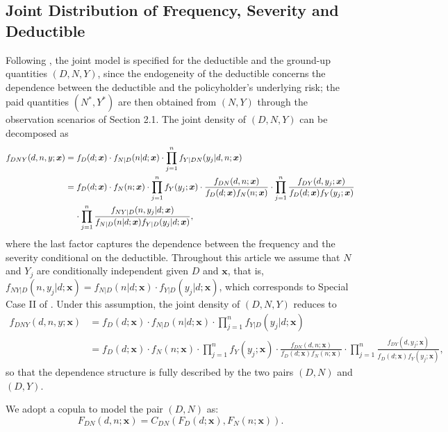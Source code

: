 \documentclass[11pt]{article}
\begin{document}
\subsection{Joint Distribution of Frequency, Severity and Deductible}
\label{sec:distn}

{Following \citet{shi2022copula}, the joint model is specified for the deductible and the ground-up quantities $(D,N,Y)$, since the endogeneity of the deductible concerns the dependence between the deductible and the policyholder's underlying risk; the paid quantities $(N^*, Y^*)$ are then obtained from $(N,Y)$ through the observation scenarios of Section 2.1. The joint density of $(D,N,Y)$ can be decomposed as}
{
\begin{align*}
   f_{DNY}(d,n,y;\bm{x}) &= f_{D}(d;\bm{x})\cdot f_{N|D}(n|d;\bm{x})\cdot \prod_{j=1}^{n}f_{Y|DN}(y_j|d,n;\bm{x})\\
   & =f_D(d;\bm{x})\cdot f_{N}(n;\bm{x})\cdot \prod_{j=1}^{n}f_{Y}(y_j;\bm{x})\cdot\frac{f_{DN}(d,n;\bm{x})}{f_D(d;\bm{x})f_{N}(n;\bm{x})}\cdot \prod_{j=1}^{n}\frac{f_{DY}(d,y_j;\bm{x})}{f_D(d;\bm{x})f_{Y}(y_j;\bm{x})} \\
   & \hspace{0.4cm}\cdot \prod_{j=1}^{n}\frac{f_{NY|D}(n,y_j|d;\bm{x})}{f_{N|D}(n|d;\bm{x})f_{Y|D}(y_j|d;\bm{x})},
\end{align*}
}
{where the last factor captures the dependence between the frequency and the severity conditional on the deductible. Throughout this article we assume that $N$ and $Y_j$ are conditionally independent given $D$ and $\bm{x}$, that is,
$f_{NY|D}(n,y_j|d;\bm{x})=f_{N|D}(n|d;\bm{x})\cdot f_{Y|D}(y_j|d;\bm{x})$, which corresponds to Special Case II of \citet{shi2022copula}. Under this assumption, the joint density of $(D,N,Y)$ reduces to}
{
\begin{align*}
   f_{DNY}(d,n,y;\bm{x}) &= f_{D}(d;\bm{x})\cdot f_{N|D}(n|d;\bm{x})\cdot \prod_{j=1}^{n}f_{Y|D}(y_j|d;\bm{x})\\
   & =f_D(d;\bm{x})\cdot f_{N}(n;\bm{x})\cdot \prod_{j=1}^{n}f_{Y}(y_j;\bm{x})\cdot\frac{f_{DN}(d,n;\bm{x})}{f_D(d;\bm{x})f_{N}(n;\bm{x})}\cdot \prod_{j=1}^{n}\frac{f_{DY}(d,y_j;\bm{x})}{f_D(d;\bm{x})f_{Y}(y_j;\bm{x})},
\end{align*}
}
{so that the dependence structure is fully described by the two pairs $(D,N)$ and $(D,Y)$.}

We adopt a copula to model the pair {$(D,N)$} as:
\begin{equation} \label{eq:FreqCopula}
	F_{DN}(d,n;\bm{x}) = C_{DN}(F_D(d;\bm{x}),F_{N}(n;\bm{x})).
\end{equation}
\end{document}
